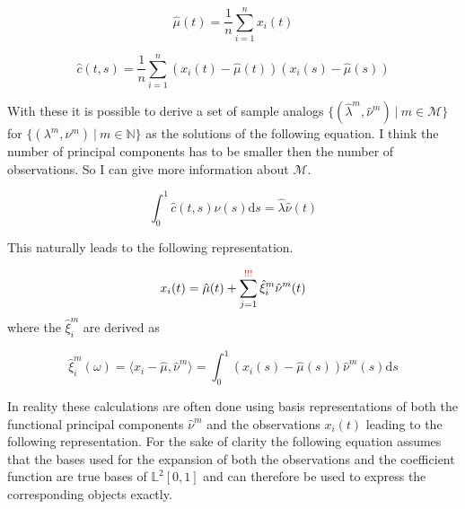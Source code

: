 \documentclass[11pt,twoside,a4paper]{article}
\begin{document}
	\begin{equation}
		\hat{\mu}(t) = \frac{1}{n}\sum_{i = 1}^{n}x_i(t)
	\end{equation}
	
	\begin{equation}
		\hat{c}(t,s) = \frac{1}{n} \sum_{i = 1}^{n} \left(x_i(t) - \hat{\mu}(t)\right) \left(x_i(s) - \hat{\mu}(s)\right)
	\end{equation}
	
	With these it is possible to derive a set of sample analogs $\{(\hat{\lambda}^m, \hat{\nu}^m) \: \vert \: m \in \mathcal{M}\}$ for $\{(\lambda^m, \nu^m) \: \vert \: m \in \mathbb{N}\}$ as the solutions of the following equation. {\color{red} I think the number of principal components has to be smaller then the number of observations. So I can give more information about $\mathcal{M}$.}
	
	\begin{equation}
		\int_{0}^{1}\hat{c}(t,s)\hat{\nu}(s) \mathrm{d}s = \hat{\lambda} \hat{\nu}(t)
	\end{equation}
	
	This naturally leads to the following representation.
	
	\begin{equation}
		x_i(t) = \hat{\mu}(t) + \sum_{j = 1}^{{\color{red} !!!}} \hat{\xi}_{i}^{m} \hat{\nu}^{m}(t)
	\end{equation}
	where the $\hat{\xi}_{i}^m$ are derived as 
	
	\begin{equation}
		\hat{\xi}_i^m(\omega) = \langle x_i - \hat{\mu}, \hat{\nu}^m\rangle = \int_{0}^{1} \left(x_i(s) - \hat{\mu}(s)\right) \hat{\nu}^m(s) \mathrm{d}s
	\end{equation}
	
	In reality these calculations are often done using basis representations of both the functional principal components $\hat{\nu}^m$ and the observations $x_i(t)$ leading to the following representation. For the sake of clarity the following equation assumes that the bases used for the expansion of both the observations and the coefficient function are true bases of $\mathbb{L}^2[0,1]$ and can therefore be used to express the corresponding objects exactly.
	
\end{document}
